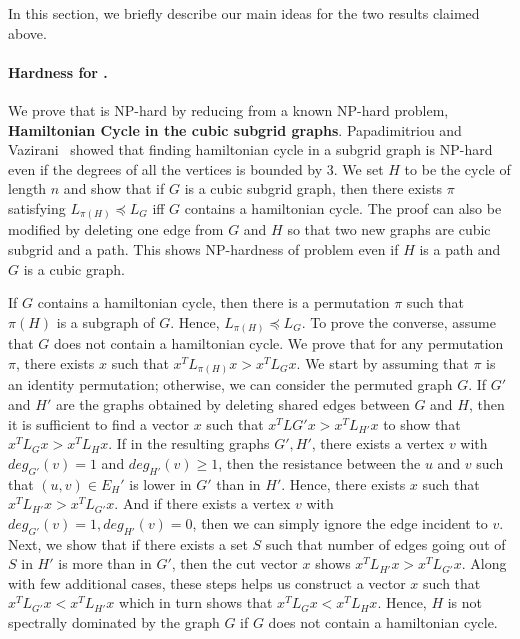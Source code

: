 In this section, we briefly describe our main ideas for the two results claimed above.

\paragraph{\textbf {Hardness for \GD.} } We prove that \GD is NP-hard by reducing from a known NP-hard problem, {\bf Hamiltonian Cycle in the cubic subgrid graphs}. Papadimitriou and Vazirani~\cite{PapadimitriouV84} showed that finding hamiltonian cycle in a subgrid graph is NP-hard even if the degrees of all the vertices is bounded by $3$. We set $H$ to be the cycle of length $n$ and show that if $G$ is a cubic subgrid graph, then there exists $\pi$ satisfying $L_{\pi(H)} \preceq L_G$ iff $G$ contains a hamiltonian cycle. The proof can also be modified by deleting one edge from $G$ and $H$ so that two new graphs are cubic subgrid and a path. This shows NP-hardness of \GD problem even if $H$ is a path and $G$ is a cubic graph. 

If $G$ contains a hamiltonian cycle, then there is a permutation $\pi$ such that $\pi(H)$ is a subgraph of $G$. Hence, $L_{\pi(H)} \preceq L_G$. To prove the converse, assume that $G$ does not contain a hamiltonian cycle. We prove that for any permutation $\pi$, there exists $x$ such that $x^T L_{\pi(H)} x > x^T L_G x$. We start by assuming that $\pi$ is an identity permutation; otherwise, we can consider the permuted graph $G$. If $G'$ and $H'$ are the graphs obtained by deleting shared edges between $G$ and $H$, then it is sufficient to find a vector $x$ such that $x^T L{G'} x > x^T L_{H'} x$ to show that $x^T L_G x > x^T L_H x$. If in the resulting graphs $G',H'$, there exists a vertex $v$ with $deg_{G'}(v) =1$ and $deg_{H'}(v) \geq 1$, then the resistance between the $u$ and $v$ such that $(u,v) \in E_H'$ is lower in $G'$ than in $H'$. Hence, there exists $x$ such that $x^T L_{H'} x > x^T L_{G'} x$. And if there exists a vertex $v$ with $deg_{G'}(v) = 1, deg_{H'}(v) = 0$, then we can simply ignore the edge incident to $v$. Next, we show that if there exists a set $S$ such that number of edges going out of $S$ in $H'$ is more than in $G'$, then the cut vector $x$ shows $x^T L_{H'} x > x^T L_{G'} x$. Along with few additional cases, these steps helps us construct a vector $x$ such that $x^T L_{G'} x < x^T L_{H'} x$ which in turn shows that $x^T L_G x < x^T L_H x$. Hence, $H$ is not spectrally dominated by the graph $G$ if $G$ does not contain a hamiltonian cycle. 

